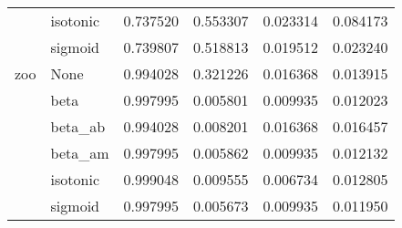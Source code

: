 \begin{tabular}{llrrrr}
        & isotonic &  0.737520 &  0.553307 &  0.023314 &  0.084173 \\
        & sigmoid &  0.739807 &  0.518813 &  0.019512 &  0.023240 \\
zoo & None &  0.994028 &  0.321226 &  0.016368 &  0.013915 \\
        & beta &  0.997995 &  0.005801 &  0.009935 &  0.012023 \\
        & beta\_ab &  0.994028 &  0.008201 &  0.016368 &  0.016457 \\
        & beta\_am &  0.997995 &  0.005862 &  0.009935 &  0.012132 \\
        & isotonic &  0.999048 &  0.009555 &  0.006734 &  0.012805 \\
        & sigmoid &  0.997995 &  0.005673 &  0.009935 &  0.011950 \\
\bottomrule
\end{tabular}
